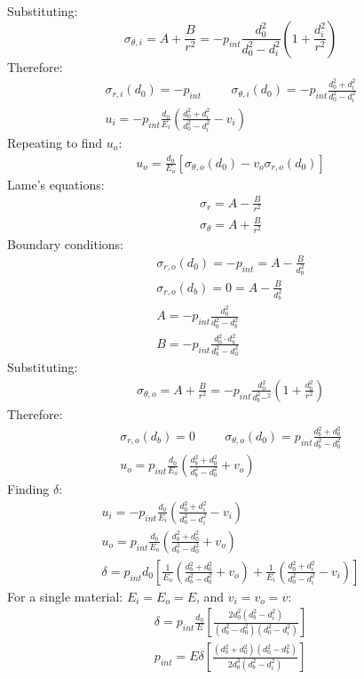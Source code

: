 \documentclass[11pt]{article}
\numberwithin{equation}{section}
\begin{document}
Substituting:
\begin{equation}
    \sigma_{\theta,i} = A + \frac{B}{r^2} = -p_{int}\frac{d_0^2}{d_0^2 - d_i^2} \left(1 + \frac{d_i^2}{r^2}\right)
\end{equation}
Therefore:
\begin{gather}
    \sigma_{r,i}(d_0) = -p_{int} \hspace{1cm} \sigma_{\theta,i}(d_0) = -p_{int}\frac{d_0^2 + d_i^2}{d_0^2 - d_i^2}\\
    u_i = -p_{int} \frac{d_0}{E_i} \left(\frac{d_0^2 + d_i^2}{d_0^2 - d_i^2} - v_i\right)
\end{gather}
Repeating to find $u_o$:
\begin{gather}
    u_o = \frac{d_0}{E_o}\left[\sigma_{\theta,o} (d_0) - v_o \sigma_{r,o}(d_0)\right]
\end{gather}
Lame's equations:
\begin{gather}
    \sigma_r = A - \frac{B}{r^2}\\
    \sigma_{\theta} = A + \frac{B}{r^2}
\end{gather}
Boundary conditions:
\begin{gather}
    \sigma_{r,o}(d_0) = -p_{int} = A - \frac{B}{d_0^2}\\
    \sigma_{r,o}(d_b) = 0 = A - \frac{B}{d_b^2}\\
    A = -p_{int} \frac{d_0^2}{d_0^2- d_b^2}\\
    B = -p_{int} \frac{d_0^2 \cdot d_b^2}{d_b^2 - d_0^2}
\end{gather}
Substituting:
\begin{gather}
    \sigma_{\theta,o} = A + \frac{B}{r^2} = -p_{int} \frac{d_0^2}{d_b^2 - ^2} \left(1+ \frac{d_b^2}{r^2}\right)
\end{gather}
Therefore:
\begin{gather}
    \sigma_{r,o}(d_b) = 0 \hspace{1cm} \sigma_{\theta,o}(d_0) = p_{int}\frac{d_b^2 + d_0^2}{d_b^2 -d_0^2}\\
    u_o = p_{int} \frac{d_0}{E_o}\left(\frac{d_b^2 + d_0^2}{d_b^2 - d_0^2} + v_o\right)
\end{gather}
Finding $\delta$:
\begin{gather}
    u_i =-p_{int}\frac{d_0}{E_i}\left(\frac{d_0^2 + d_i^2 }{d_0^2 - d_i^2}-v_i\right)\\
    u_o = p_{int}\frac{d_0}{E_o}\left(\frac{d_b^2 + d_0^2 }{d_b^2 - d_0^2}+v_o\right)\\
    \delta = p_{int}d_0\left[\frac{1}{E_o}\left(\frac{d_b^2 + d_0^2}{d_b^2 - d_0^2}+v_o\right) + \frac{1}{E_i}\left(\frac{d_0^2 + d_i^2}{d_0^2 - d_i^2}-v_i\right)\right]
\end{gather}
For a single material: $E_i = E_o = E$, and $v_i = v_o = v$:
\begin{gather}
    \delta = p_{int} \frac{d_0}{E}\left[\frac{2d_0^2\left(d_b^2-d_i^2\right)}{\left(d_b^2 - d_0^2\right)\left(d_0^2-d_i^2\right)}\right]\\
    p_{int} = E \delta \left[\frac{\left(d_b^2 + d_0^2\right)\left(d_0^2 - d_b^2\right)}{2d_0^3\left(d_b^2 - d_i^2\right)}\right]
\end{gather}
\end{document}
